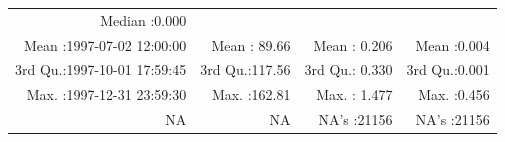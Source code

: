 \documentclass[
  10pt,
  a4paper,oneside]{article}
\begin{document}
\begin{longtable}[]{@{}rrrr@{}}
\begin{minipage}[t]{0.19\columnwidth}
Median :0.000\strut
\end{minipage}\tabularnewline
\begin{minipage}[t]{0.33\columnwidth}\raggedleft
Mean :1997-07-02 12:00:00\strut
\end{minipage} & \begin{minipage}[t]{0.19\columnwidth}\raggedleft
Mean : 89.66\strut
\end{minipage} & \begin{minipage}[t]{0.19\columnwidth}\raggedleft
Mean : 0.206\strut
\end{minipage} & \begin{minipage}[t]{0.19\columnwidth}\raggedleft
Mean :0.004\strut
\end{minipage}\tabularnewline
\begin{minipage}[t]{0.33\columnwidth}\raggedleft
3rd Qu.:1997-10-01 17:59:45\strut
\end{minipage} & \begin{minipage}[t]{0.19\columnwidth}\raggedleft
3rd Qu.:117.56\strut
\end{minipage} & \begin{minipage}[t]{0.19\columnwidth}\raggedleft
3rd Qu.: 0.330\strut
\end{minipage} & \begin{minipage}[t]{0.19\columnwidth}\raggedleft
3rd Qu.:0.001\strut
\end{minipage}\tabularnewline
\begin{minipage}[t]{0.33\columnwidth}\raggedleft
Max. :1997-12-31 23:59:30\strut
\end{minipage} & \begin{minipage}[t]{0.19\columnwidth}\raggedleft
Max. :162.81\strut
\end{minipage} & \begin{minipage}[t]{0.19\columnwidth}\raggedleft
Max. : 1.477\strut
\end{minipage} & \begin{minipage}[t]{0.19\columnwidth}\raggedleft
Max. :0.456\strut
\end{minipage}\tabularnewline
\begin{minipage}[t]{0.33\columnwidth}\raggedleft
NA\strut
\end{minipage} & \begin{minipage}[t]{0.19\columnwidth}\raggedleft
NA\strut
\end{minipage} & \begin{minipage}[t]{0.19\columnwidth}\raggedleft
NA's :21156\strut
\end{minipage} & \begin{minipage}[t]{0.19\columnwidth}\raggedleft
NA's :21156\strut
\end{minipage}\tabularnewline
\bottomrule
\end{longtable}
\end{document}
